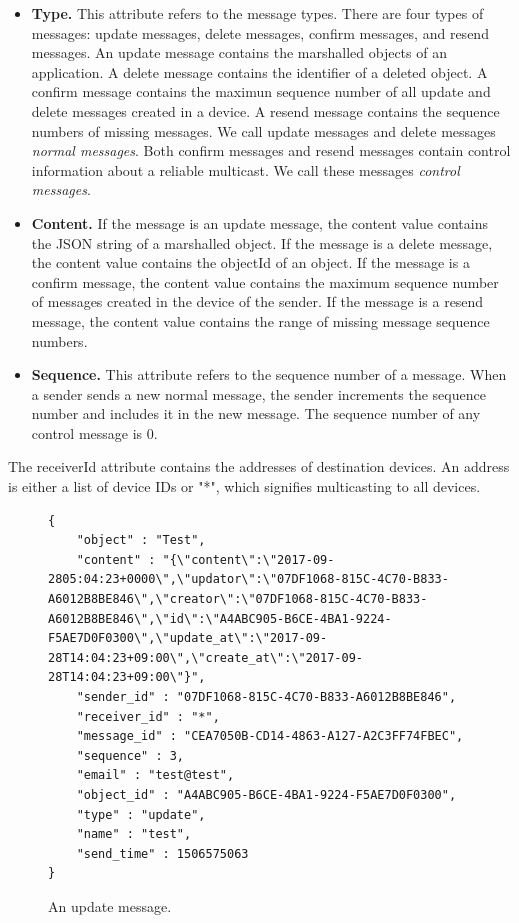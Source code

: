 \documentclass[a4paper,11pt]{report}
\begin{document}
\begin{itemize}[leftmargin=7mm]
	\setlength{\itemsep}{1pt}
	\setlength{\parskip}{0pt}
	\setlength{\parsep}{0pt}
	\item \textbf{Type.}
	This attribute refers to the message types.
	There are four types of messages: update messages, delete messages, confirm messages, and resend messages.
	An update message contains the marshalled objects of an application.
	A delete message contains the identifier of a deleted object.
	A confirm message contains the maximun sequence number of all update and delete messages created in a device.
	A resend message contains the sequence numbers of missing messages.
	We call update messages and delete messages \emph{normal messages}. 
	Both confirm messages and resend messages contain control information about a reliable multicast. 
	We call these messages \emph{control messages}.
	\item \textbf{Content.} 
	If the message is an update message, the content value contains the JSON string of a marshalled object.
	If the message is a delete message, the content value contains the objectId of an object.
	If the message is a confirm message, the content value contains the maximum sequence number of messages created in the device of the sender.
	If the message is a resend message, the content value contains the range of missing message sequence numbers.
	\item \textbf{Sequence.}
	This attribute refers to the sequence number of a message.
	When a sender sends a new normal message, the sender increments the sequence number and includes it in the new message.
	The sequence number of any control message is 0.
\end{itemize}

The receiverId attribute contains the addresses of destination devices.
An address is either a list of device IDs or "*", which signifies multicasting to all devices.

\begin{figure}
\begin{lstlisting}[frame=none language=JSON] 
{
    "object" : "Test",
    "content" : "{\"content\":\"2017-09-2805:04:23+0000\",\"updator\":\"07DF1068-815C-4C70-B833-A6012B8BE846\",\"creator\":\"07DF1068-815C-4C70-B833-A6012B8BE846\",\"id\":\"A4ABC905-B6CE-4BA1-9224-F5AE7D0F0300\",\"update_at\":\"2017-09-28T14:04:23+09:00\",\"create_at\":\"2017-09-28T14:04:23+09:00\"}",
    "sender_id" : "07DF1068-815C-4C70-B833-A6012B8BE846",
    "receiver_id" : "*",
    "message_id" : "CEA7050B-CD14-4863-A127-A2C3FF74FBEC",
    "sequence" : 3,
    "email" : "test@test",
    "object_id" : "A4ABC905-B6CE-4BA1-9224-F5AE7D0F0300",
    "type" : "update",
    "name" : "test",
    "send_time" : 1506575063
}		
\end{lstlisting}
\caption{An update message.}
\label{fig:grouper_message}
\end{figure}
\end{document}
